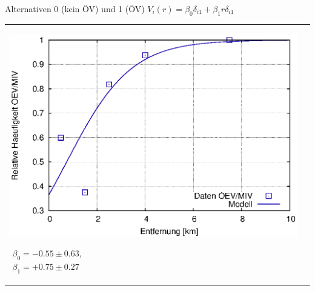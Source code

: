 \documentclass[a4paper]{foils}
\begin{document}
\begin{landscape}
\begin{center}
\newpage

\vspace{0em}  


{\small Alternativen 0 (kein \"OV) und 1 (\"OV) \quad
$V_i(r)=\beta_0 \delta_{i1} + \beta_1 r \delta_{i1}$}


\begin{tabular}{ll}
\parbox{1.00\textwidth}{
\includegraphics[width=1.0\textwidth]{figsRegr/revealedChoiceWS1516cum_2al_fProb_r.eps}
}
\parbox{0.30\textwidth}{
 {\small
 $
 \begin{array}{l}
 \beta_0=-0.55\pm 0.63, \\
 \beta_1=+0.75\pm 0.27
 \end{array}
 $
}}
\end{tabular}




\end{center}
\end{landscape}
\end{document}
